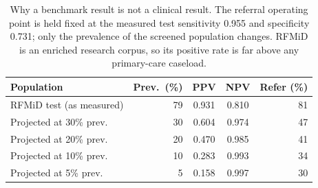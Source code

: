 \begin{table}[!t]
\centering
\caption{Why a benchmark result is not a clinical result. The referral operating point is held
fixed at the measured test sensitivity 0.955 and specificity
0.731; only the prevalence of the screened population changes. RFMiD is an
enriched research corpus, so its positive rate is far above any primary-care caseload.}
\label{tab:prevalence}
\scriptsize
\setlength{\tabcolsep}{3.5pt}
\begin{tabular}{lrccr}
\toprule
Population & Prev.\ (\%) & PPV & NPV & Refer (\%) \\
\midrule
RFMiD test (as measured) & 79 & 0.931 & 0.810 & 81 \\
\midrule
Projected at 30\% prev. & 30 & 0.604 & 0.974 & 47 \\
Projected at 20\% prev. & 20 & 0.470 & 0.985 & 41 \\
Projected at 10\% prev. & 10 & 0.283 & 0.993 & 34 \\
Projected at 5\% prev. & 5 & 0.158 & 0.997 & 30 \\
\bottomrule
\end{tabular}
\end{table}
